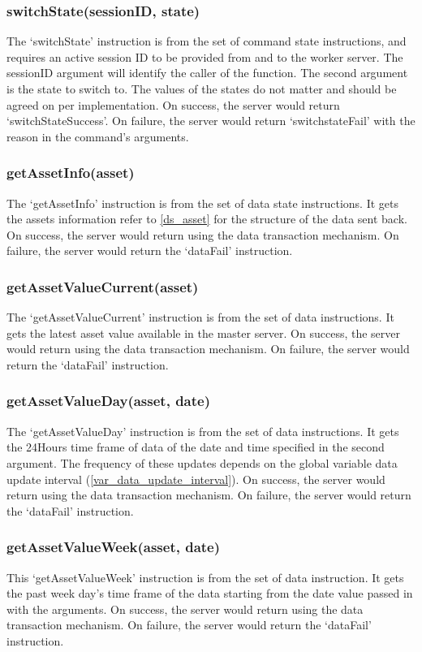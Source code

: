 \documentclass[a4paper]{article}
\begin{document}
\subsubsection{switchState(sessionID, state)}
The `switchState' instruction is from the set of command state instructions,
and requires an active session ID to be provided from and to the worker server.
The sessionID argument will identify the caller of the function. The second
argument is the state to switch to. The values of the states do not matter and
should be agreed on per implementation. On success, the server would return 
`switchStateSuccess'. On failure, the server would return `switchstateFail'
with the reason in the command's arguments.

\subsubsection{getAssetInfo(asset)}
The `getAssetInfo' instruction is from the set of data state instructions. It
gets the assets information refer to \ref{ds_asset} for the structure of the
data sent back. On success, the server would return using the data transaction
mechanism. On failure, the server would return the `dataFail' instruction.

\subsubsection{getAssetValueCurrent(asset)}
The `getAssetValueCurrent' instruction is from the set of data instructions. It
gets the latest asset value available in the master server. On success, the
server would return using the data transaction mechanism. On failure, the
server would return the `dataFail' instruction.

\subsubsection{getAssetValueDay(asset, date)}
The `getAssetValueDay' instruction is from the set of data instructions. It
gets the 24Hours time frame of data of the date and time specified in the
second argument. The frequency of these updates depends on the global variable
data update interval (\ref{var_data_update_interval}). On success, the server
would return using the data transaction mechanism. On failure, the server would
return the `dataFail' instruction.

\subsubsection{getAssetValueWeek(asset, date)}
This `getAssetValueWeek' instruction is from the set of data instruction. It
gets the past week day's time frame of the data starting from the date value
passed in with the arguments. On success, the server would return using the
data transaction mechanism. On failure, the server would return the `dataFail'
instruction.
\end{document}
